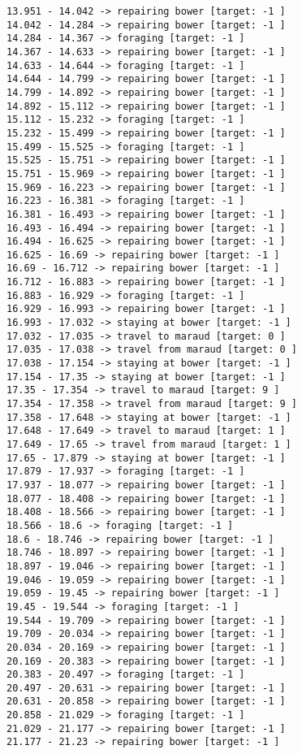 \documentclass[11pt]{article}
\begin{document}
\begin{Verbatim}[commandchars=\\\{\}]
13.951 - 14.042 -> repairing bower [target: -1 ]
14.042 - 14.284 -> repairing bower [target: -1 ]
14.284 - 14.367 -> foraging [target: -1 ]
14.367 - 14.633 -> repairing bower [target: -1 ]
14.633 - 14.644 -> foraging [target: -1 ]
14.644 - 14.799 -> repairing bower [target: -1 ]
14.799 - 14.892 -> repairing bower [target: -1 ]
14.892 - 15.112 -> repairing bower [target: -1 ]
15.112 - 15.232 -> foraging [target: -1 ]
15.232 - 15.499 -> repairing bower [target: -1 ]
15.499 - 15.525 -> foraging [target: -1 ]
15.525 - 15.751 -> repairing bower [target: -1 ]
15.751 - 15.969 -> repairing bower [target: -1 ]
15.969 - 16.223 -> repairing bower [target: -1 ]
16.223 - 16.381 -> foraging [target: -1 ]
16.381 - 16.493 -> repairing bower [target: -1 ]
16.493 - 16.494 -> repairing bower [target: -1 ]
16.494 - 16.625 -> repairing bower [target: -1 ]
16.625 - 16.69 -> repairing bower [target: -1 ]
16.69 - 16.712 -> repairing bower [target: -1 ]
16.712 - 16.883 -> repairing bower [target: -1 ]
16.883 - 16.929 -> foraging [target: -1 ]
16.929 - 16.993 -> repairing bower [target: -1 ]
16.993 - 17.032 -> staying at bower [target: -1 ]
17.032 - 17.035 -> travel to maraud [target: 0 ]
17.035 - 17.038 -> travel from maraud [target: 0 ]
17.038 - 17.154 -> staying at bower [target: -1 ]
17.154 - 17.35 -> staying at bower [target: -1 ]
17.35 - 17.354 -> travel to maraud [target: 9 ]
17.354 - 17.358 -> travel from maraud [target: 9 ]
17.358 - 17.648 -> staying at bower [target: -1 ]
17.648 - 17.649 -> travel to maraud [target: 1 ]
17.649 - 17.65 -> travel from maraud [target: 1 ]
17.65 - 17.879 -> staying at bower [target: -1 ]
17.879 - 17.937 -> foraging [target: -1 ]
17.937 - 18.077 -> repairing bower [target: -1 ]
18.077 - 18.408 -> repairing bower [target: -1 ]
18.408 - 18.566 -> repairing bower [target: -1 ]
18.566 - 18.6 -> foraging [target: -1 ]
18.6 - 18.746 -> repairing bower [target: -1 ]
18.746 - 18.897 -> repairing bower [target: -1 ]
18.897 - 19.046 -> repairing bower [target: -1 ]
19.046 - 19.059 -> repairing bower [target: -1 ]
19.059 - 19.45 -> repairing bower [target: -1 ]
19.45 - 19.544 -> foraging [target: -1 ]
19.544 - 19.709 -> repairing bower [target: -1 ]
19.709 - 20.034 -> repairing bower [target: -1 ]
20.034 - 20.169 -> repairing bower [target: -1 ]
20.169 - 20.383 -> repairing bower [target: -1 ]
20.383 - 20.497 -> foraging [target: -1 ]
20.497 - 20.631 -> repairing bower [target: -1 ]
20.631 - 20.858 -> repairing bower [target: -1 ]
20.858 - 21.029 -> foraging [target: -1 ]
21.029 - 21.177 -> repairing bower [target: -1 ]
21.177 - 21.23 -> repairing bower [target: -1 ]

\end{Verbatim}
\end{document}
